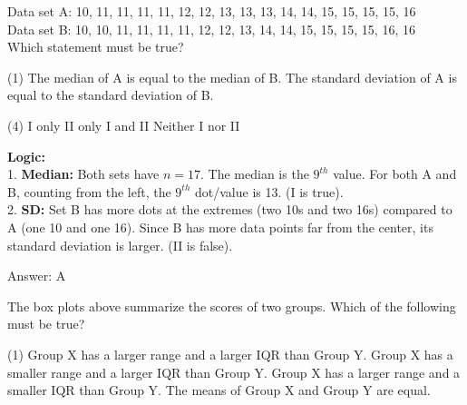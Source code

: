 \documentclass[11pt,paper=a4,answers]{exam}
\begin{document}
\begin{questions}
\vspace{60pt}

\question
Data set A: 10, 11, 11, 11, 11, 12, 12, 13, 13, 13, 14, 14, 15, 15, 15, 15, 16 \\
Data set B: 10, 10, 11, 11, 11, 11, 12, 12, 13, 14, 14, 15, 15, 15, 15, 16, 16 \\
Which statement must be true?
\begin{tasks}(1)
    \task The median of A is equal to the median of B.
    \task The standard deviation of A is equal to the standard deviation of B.
\end{tasks}
\begin{tasks}(4)
    \task I only
    \task II only
    \task I and II
    \task Neither I nor II
\end{tasks}

\begin{solution}
\textbf{Logic:} \\
1. \textbf{Median:} Both sets have $n=17$. The median is the $9^{th}$ value. For both A and B, counting from the left, the $9^{th}$ dot/value is 13. (I is true). \\
2. \textbf{SD:} Set B has more dots at the extremes (two 10s and two 16s) compared to A (one 10 and one 16). Since B has more data points far from the center, its standard deviation is larger. (II is false).

\vspace{30pt}

Answer: \colorbox{yellow!100}{A}
\end{solution}

\vspace{60pt}

\question
\begin{center}
\end{center}
The box plots above summarize the scores of two groups. Which of the following must be true?
\begin{tasks}(1)
    \task Group X has a larger range and a larger IQR than Group Y.
    \task Group X has a smaller range and a larger IQR than Group Y.
    \task Group X has a larger range and a smaller IQR than Group Y.
    \task The means of Group X and Group Y are equal.
\end{tasks}


\end{questions}
\end{document}
